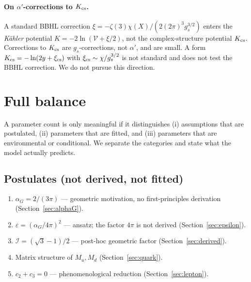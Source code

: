 \documentclass[12pt,a4paper]{article}
\numberwithin{equation}{section}
\begin{document}
\paragraph{On \(\alpha'\)-corrections to \(K_{\rm cs}\).}
A standard BBHL correction \(\xi = -\zeta(3)\chi(X)/(2(2\pi)^3 g_s^{3/2})\)
enters the \emph{K\"ahler} potential \(K = -2\ln(\mathcal{V}+\xi/2)\),
not the complex-structure potential \(K_{\rm cs}\). Corrections to
\(K_{\rm cs}\) are \(g_s\)-corrections, not \(\alpha'\), and are small.
A form \(K_{\rm cs} = -\ln(2y+\xi_{\rm cs})\) with
\(\xi_{\rm cs} \sim \chi/g_s^{3/2}\) is not standard and does not
test the BBHL correction. We do not pursue this direction.

\section{Full balance}
\label{sec:balance}

A parameter count is only meaningful if it distinguishes (i) assumptions
that are postulated, (ii) parameters that are fitted, and (iii) parameters
that are environmental or conditional. We separate the categories and
state what the model actually predicts.

\subsection{Postulates (not derived, not fitted)}
\begin{enumerate}[leftmargin=1.5em]
\item \(\alpha_G = 2/(3\pi)\) --- geometric motivation, no first-principles derivation (Section~\ref{sec:alphaG}).
\item \(\varepsilon = (\alpha_G/4\pi)^2\) --- ansatz; the factor \(4\pi\) is not derived (Section~\ref{sec:epsilon}).
\item \(\mathcal{I} = (\sqrt3-1)/2\) --- post-hoc geometric factor (Section~\ref{sec:derived}).
\item Matrix structure of \(M_u, M_d\) (Section~\ref{sec:quark}).
\item \(c_2 + c_3 = 0\) --- phenomenological reduction (Section~\ref{sec:lepton}).
\end{enumerate}
\end{document}
